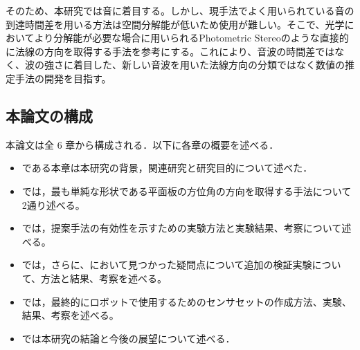 そのため、本研究では音に着目する。しかし、現手法でよく用いられている音の到達時間差を用いる方法は空間分解能が低いため使用が難しい。そこで、光学においてより分解能が必要な場合に用いられるPhotometric Stereoのような直接的に法線の方向を取得する手法を参考にする。これにより、音波の時間差ではなく、波の強さに着目した、新しい音波を用いた法線方向の分類ではなく数値の推定手法の開発を目指す。


\subsection{本論文の構成}
\label{sec:organization}
本論文は全 6 章から構成される．以下に各章の概要を述べる．

\begin{itemize}
  \item {}である本章は本研究の背景，関連研究と研究目的について述べた．
  \item {}では，最も単純な形状である平面板の方位角の方向を取得する手法について2通り述べる。
  \item {}では，提案手法の有効性を示すための実験方法と実験結果、考察について述べる。
  \item {}では，さらに、において見つかった疑問点について追加の検証実験について、方法と結果、考察を述べる。
  \item {}では，最終的にロボットで使用するためのセンサセットの作成方法、実験、結果、考察を述べる。
  \item {}では本研究の結論と今後の展望について述べる．
\end{itemize}

\newpage


\newpage
